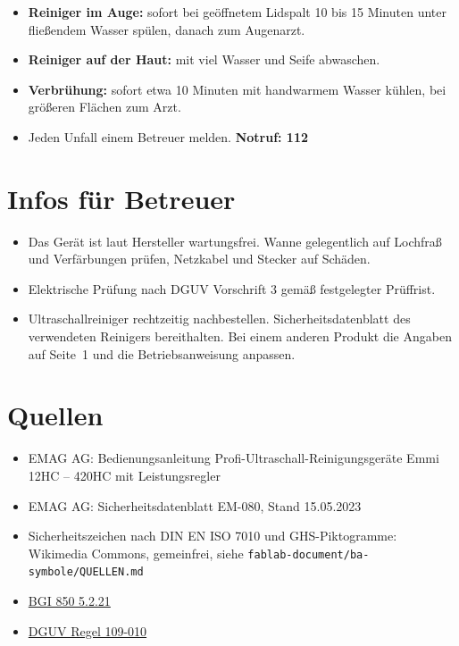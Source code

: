 \documentclass{\basedir/fablab-document}
\begin{document}
	\begin{itemize}
		\item \textbf{Reiniger im Auge:} sofort bei geöffnetem Lidspalt 10 bis 15 Minuten unter fließendem Wasser spülen, danach zum Augenarzt.
		\item \textbf{Reiniger auf der Haut:} mit viel Wasser und Seife abwaschen.
		\item \textbf{Verbrühung:} sofort etwa 10 Minuten mit handwarmem Wasser kühlen, bei größeren Flächen zum Arzt.
		\item Jeden Unfall einem Betreuer melden. \textbf{Notruf: 112}
	\end{itemize}

	\section{Infos für Betreuer}

	\begin{itemize}
		\item Das Gerät ist laut Hersteller wartungsfrei. Wanne gelegentlich auf Lochfraß und Verfärbungen prüfen, Netzkabel und Stecker auf Schäden.
		\item Elektrische Prüfung nach DGUV Vorschrift 3 gemäß festgelegter Prüffrist.
		\item Ultraschallreiniger rechtzeitig nachbestellen. Sicherheitsdatenblatt des verwendeten Reinigers bereithalten. Bei einem anderen Produkt die Angaben auf Seite~1 und die Betriebsanweisung anpassen.
	\end{itemize}

	\section{Quellen}

	\begin{itemize}
		\item EMAG AG: Bedienungsanleitung Profi-Ultraschall-Reinigungsgeräte Emmi 12HC -- 420HC mit Leistungsregler
		\item EMAG AG: Sicherheitsdatenblatt EM-080, Stand 15.05.2023
		\item Sicherheitszeichen nach DIN EN ISO 7010 und GHS-Piktogramme: Wikimedia Commons, gemeinfrei, siehe \texttt{fablab-document/ba-symbole/QUELLEN.md}
		\item \href{http://bgi850-0.vur.jedermann.de/index.jsp?isbn=bgi850-0&alias=bgc_bi850_0_bi850_0_s5_2_21_}{BGI 850 5.2.21}
		\item \href{http://www.arbeitssicherheit.de/de/html/library/document/4989034,37}{DGUV Regel 109-010}
	\end{itemize}
\end{document}
